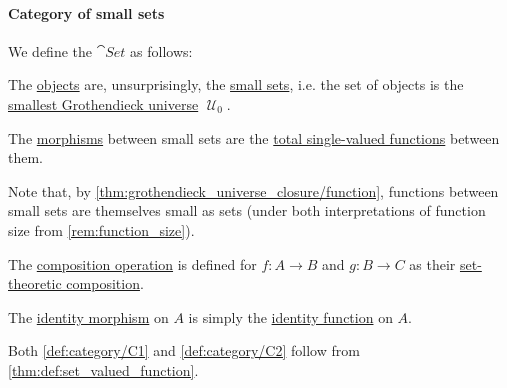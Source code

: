 \paragraph{Category of small sets}

\begin{definition}\label{def:category_of_small_sets}
  We define the  \( \cat{Set} \) as follows:
  \begin{thmenum}
     The \hyperref[def:category/objects]{objects} are, unsurprisingly, the \hyperref[def:small_set]{small sets}, i.e. the set of objects is the \hyperref[def:smallest_grothendieck_universe]{smallest Grothendieck universe} \( \mscrU_0 \).

     The \hyperref[def:category/morphisms]{morphisms} between small sets are the \hyperref[def:function]{total single-valued functions} between them.

    Note that, by \cref{thm:grothendieck_universe_closure/function}, functions between small sets are themselves small as sets (under both interpretations of function size from \cref{rem:function_size}).

     The \hyperref[def:category/composition]{composition operation} is defined for \( f: A \to B \) and \( g: B \to C \) as their \hyperref[def:set_valued_function/composition]{set-theoretic composition}.

     The \hyperref[def:category/identity]{identity morphism} on \( A \) is simply the \hyperref[def:set_valued_function/identity]{identity function} on \( A \).
  \end{thmenum}
\end{definition}
\begin{defproof}
  Both \ref{def:category/C1} and \ref{def:category/C2} follow from \cref{thm:def:set_valued_function}.
\end{defproof}

